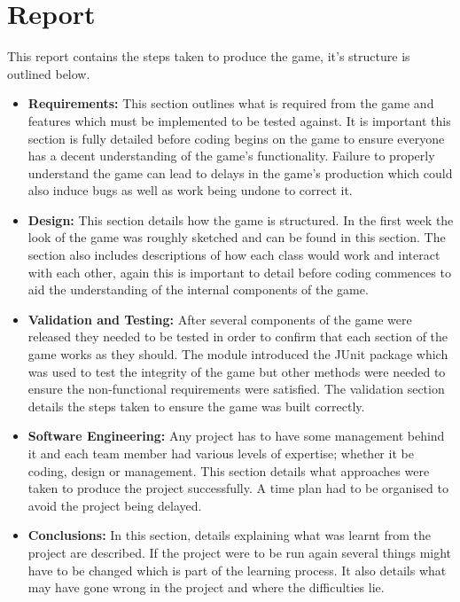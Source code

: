 \section{Report}
This report contains the steps taken to produce the game, it's structure is outlined below.
\begin{itemize}
	\item \textbf{Requirements:} This section outlines what is required from the game and features which must be implemented to be tested against. It is important this section is fully detailed before coding begins on the game to ensure everyone has a decent understanding of the game's functionality. Failure to properly understand the game can lead to delays in the game's production which could also induce bugs as well as work being undone to correct it.
	\item \textbf{Design:} This section details how the game is structured. In the first week the look of the game was roughly sketched and can be found in this section. The section also includes descriptions of how each class would work and interact with each other, again this is important to detail before coding commences to aid the understanding of the internal components of the game.
	\item \textbf{Validation and Testing:} After several components of the game were released they needed to be tested in order to confirm that each section of the game works as they should. The module introduced the JUnit package which was used to test the integrity of the game but other methods were needed to ensure the non-functional requirements were satisfied. The validation section details the steps taken to ensure the game was built correctly.
	\item \textbf{Software Engineering:} Any project has to have some management behind it and each team member had various levels of expertise; whether it be coding, design or management. This section details what approaches were taken to produce the project successfully. A time plan had to be organised to avoid the project being delayed.
	\item \textbf{Conclusions:} In this section, details explaining what was learnt from the project are described. If the project were to be run again several things might have to be changed which is part of the learning process. It also details what may have gone wrong in the project and where the difficulties lie.
\end{itemize}